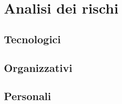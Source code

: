 

\section{Analisi dei rischi}
\subsection{Tecnologici}
\subsection{Organizzativi}
\subsection{Personali}

